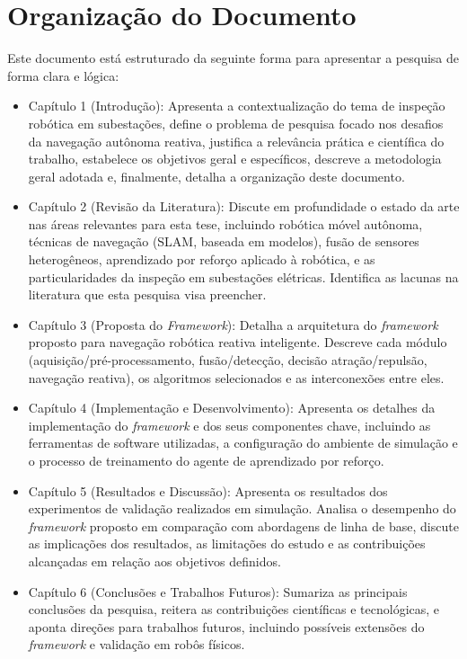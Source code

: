 \section{Organização do Documento}
Este documento está estruturado da seguinte forma para apresentar a pesquisa de forma clara e lógica:
\begin{itemize}
    \item Capítulo 1 (Introdução): Apresenta a contextualização do tema de inspeção robótica em subestações, define o problema de pesquisa focado nos desafios da navegação autônoma reativa, justifica a relevância prática e científica do trabalho, estabelece os objetivos geral e específicos, descreve a metodologia geral adotada e, finalmente, detalha a organização deste documento.
    \item Capítulo 2 (Revisão da Literatura): Discute em profundidade o estado da arte nas áreas relevantes para esta tese, incluindo robótica móvel autônoma, técnicas de navegação (SLAM, baseada em modelos), fusão de sensores heterogêneos, aprendizado por reforço aplicado à robótica, e as particularidades da inspeção em subestações elétricas. Identifica as lacunas na literatura que esta pesquisa visa preencher.
    \item Capítulo 3 (Proposta do \textit{Framework}): Detalha a arquitetura do \textit{framework} proposto para navegação robótica reativa inteligente. Descreve cada módulo (aquisição/pré-processamento, fusão/detecção, decisão atração/repulsão, navegação reativa), os algoritmos selecionados e as interconexões entre eles.
    \item Capítulo 4 (Implementação e Desenvolvimento): Apresenta os detalhes da implementação do \textit{framework} e dos seus componentes chave, incluindo as ferramentas de software utilizadas, a configuração do ambiente de simulação e o processo de treinamento do agente de aprendizado por reforço.
    \item Capítulo 5 (Resultados e Discussão): Apresenta os resultados dos experimentos de validação realizados em simulação. Analisa o desempenho do \textit{framework} proposto em comparação com abordagens de linha de base, discute as implicações dos resultados, as limitações do estudo e as contribuições alcançadas em relação aos objetivos definidos.
    \item Capítulo 6 (Conclusões e Trabalhos Futuros): Sumariza as principais conclusões da pesquisa, reitera as contribuições científicas e tecnológicas, e aponta direções para trabalhos futuros, incluindo possíveis extensões do \textit{framework} e validação em robôs físicos.
\end{itemize}
